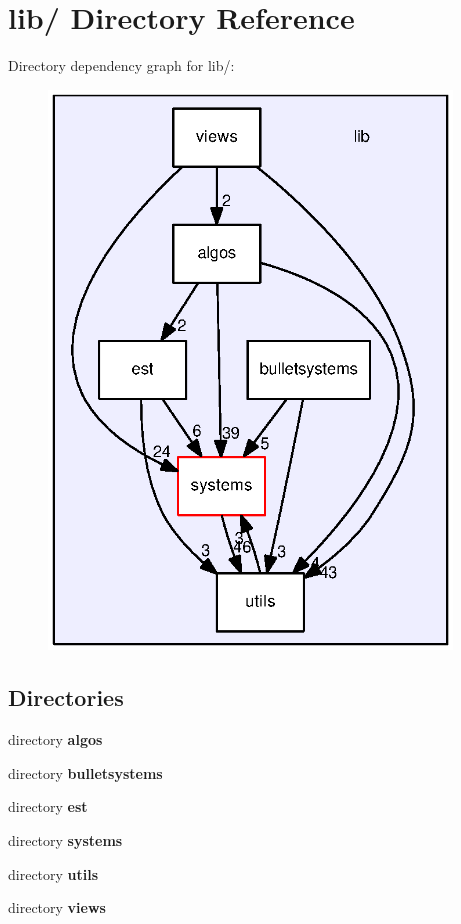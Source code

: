 \section{lib/ \-Directory \-Reference}
\label{dir_a500c0d9ec76a5160e2e420ae78a2766}
\-Directory dependency graph for lib/\-:
\nopagebreak
\begin{figure}[H]
\begin{center}
\leavevmode
\includegraphics[width=304pt]{dir_a500c0d9ec76a5160e2e420ae78a2766_dep}
\end{center}
\end{figure}
\subsection*{\-Directories}
\begin{DoxyCompactItemize}
\item 
directory {\bf algos}
\item 
directory {\bf bulletsystems}
\item 
directory {\bf est}
\item 
directory {\bf systems}
\item 
directory {\bf utils}
\item 
directory {\bf views}
\end{DoxyCompactItemize}
